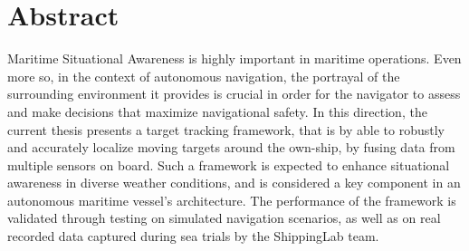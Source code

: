 \section*{Abstract}


Maritime Situational Awareness is highly important in maritime operations. Even more so, in the context of autonomous navigation, the portrayal of the surrounding environment it provides is crucial in order for the navigator to assess and make decisions that maximize navigational safety. In this direction, the current thesis presents a target tracking framework, that is by able to robustly and accurately localize moving targets around the own-ship, by fusing data from multiple sensors on board. Such a framework is expected to enhance situational awareness in diverse weather conditions, and is considered a key component in an autonomous maritime vessel's architecture. The performance of the framework is validated through testing on simulated navigation scenarios, as well as on real recorded data captured during sea trials by the ShippingLab team.

